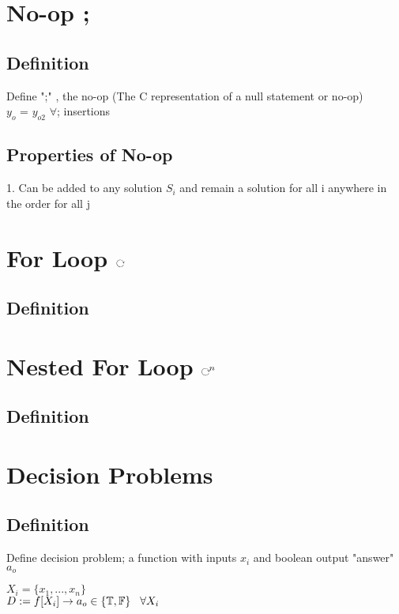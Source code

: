 \documentclass[11pt]{article}
\def \loop {\ensuremath{\rotatebox[origin=c]{-90}{$\circlearrowright$}}}
\def \nestedloop {\ensuremath{\rotatebox[origin=c]{-90}{$\circlearrowright$}}^n}
\begin{document}
\newpage
\section{No-op ;}

\subsection{Definition}
Define ";" , the no-op (The C representation of a null statement or no-op)\\
$y_o$ = $y_{o2}$ $\forall$;  insertions

\subsection{Properties of No-op}
1. Can be added to any solution $S_i$ and remain a solution for all i anywhere in the order for all j








\section{For Loop \loop}
\subsection{Definition}








\section{Nested For Loop $\nestedloop$}
\subsection{Definition}








\newpage
\section{Decision Problems}

\subsection{Definition}
Define decision problem; a function with inputs $x_i$ and boolean output "answer" $a_o$
\begin{center}
$
X_i = \{x_1,...,x_n\}
$
\\ \vspace{2mm}
$
D := f \lbrack X_i \rbrack \rightarrow a_{o} \in \{\mathbb{T}, \mathbb{F}\} \hspace{3mm} \forall X_i
$
\end{center}
\end{document}
